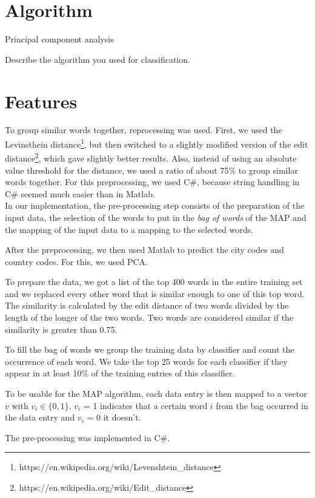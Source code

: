 \documentclass[a4paper, 11pt]{article}
\begin{document}
\section{Algorithm}

Principal component analysis

Describe the algorithm you used for classification.

\section{Features}
To group similar words together, reprocessing was used. First, we used the Levinsthein distance\footnote{https://en.wikipedia.org/wiki/Levenshtein\_distance}, but then switched to a slightly modified version of the edit distance\footnote{https://en.wikipedia.org/wiki/Edit\_distance}, which gave slightly better results. Also, instead of using an absolute value threshold for the distance, we used a ratio of about 75\% to group similar words together. For this preprocessing, we used C\#, because string handling in C\# seemed much easier than in Matlab.\\
In our implementation, the pre-processing step consists of the preparation of the input data, the selection of the words to put in the \textit{bag of words} of the MAP and the mapping of the input data to a mapping to the selected words. 

After the preprocessing, we then used Matlab to predict the city codes and country codes. For this, we used PCA.

To prepare the data, we got a list of the top 400 words in the entire training set and we replaced every other word that is similar enough to one of this top word. The similarity is calculated by the edit distance of two words divided by the length of the longer of the two words. Two words are considered similar if the similarity is greater than 0.75.

To fill the bag of words we group the training data by classifier and count the occurrence of each word. We take the top 25 words for each classifier if they appear in at least 10\% of the training entries of this classifier.

To be usable for the MAP algorithm, each data entry is then mapped to a vector $v$ with $v_i \in \lbrace0, 1\rbrace$. $v_i$ = 1 indicates that a certain word $i$ from the bag occurred in the data entry and $v_i$ = 0 it doesn't.

The pre-processing was implemented in C\#.
\end{document}

